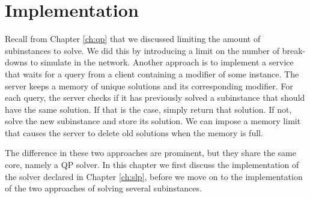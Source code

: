 \chapter{Implementation}
Recall from Chapter \ref{ch:qp} that we discussed limiting the amount
of subinstances to solve. We did this by introducing a limit on the number of
break-downs to simulate in the network.
Another approach is to implement a service that waits for a query from
a client containing a modifier of some instance. The server keeps a memory
of unique solutions and its corresponding modifier.
For each query, the server checks if it has previously solved a subinstance
that should have the same solution. If that is the case, simply return that
solution. If not, solve the new subinstance and store its solution. We can
impose a memory limit that causes the server to delete old solutions when the
memory is full.

The difference in these two approaches are prominent, but they share the same
core, namely a QP solver. In this chapter we first discuss the implementation
of the solver declared in Chapter \ref{ch:slp}, before we move on to the
implementation of the two approaches of solving several subinstances.
\label{ch:implementation}




